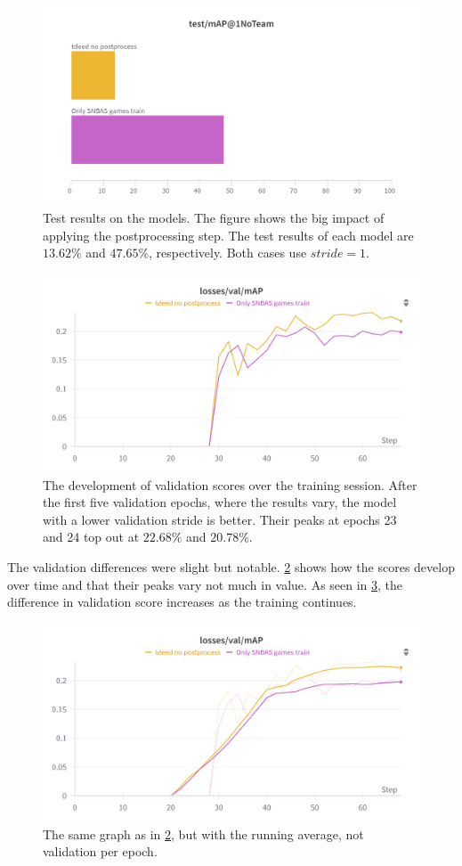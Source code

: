 \begin{figure}
    \centering
    \includegraphics[width=0.75\linewidth]{figures/no_pprocess_test.png}
    \caption{Test results on the models. The figure shows the big impact of applying the postprocessing step. The test results of each model are $13.62\%$ and $47.65\%$, respectively. Both cases use $stride=1$.}
    \label{fig:ex6:no_pp_test}
\end{figure}

\begin{figure}
    \centering
    \includegraphics[width=0.75\linewidth]{figures/no_pprocess_val.png}
    \caption{The development of validation scores over the training session. After the first five validation epochs, where the results vary, the model with a lower validation stride is better. Their peaks at epochs 23 and 24 top out at $22.68\%$ and $20.78\%$. }
        \label{fig:ex6:no_pp_val}
\end{figure}

The validation differences were slight but notable. \cref{fig:ex6:no_pp_val} shows how the scores develop over time and that their peaks vary not much in value. As seen in \cref{fig:ex6:no_pp_avg_val}, the difference in validation score increases as the training continues. 

\begin{figure}
    \centering
    \includegraphics[width=0.75\linewidth]{figures/no_pprocess_avg_val.png}
    \caption{The same graph as in \cref{fig:ex6:no_pp_val}, but with the running average, not validation per epoch.}
    \label{fig:ex6:no_pp_avg_val}
\end{figure}

